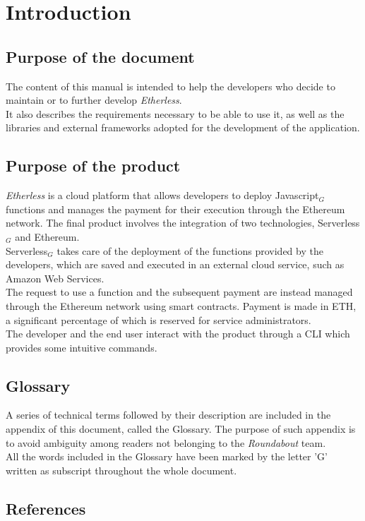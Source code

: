 \section{Introduction}

	\subsection{Purpose of the document}
	The content of this manual is intended to help the developers who decide to maintain or to further develop \textit{Etherless}. \\
	It also describes the requirements necessary to be able to use it, as well as the libraries and external frameworks adopted for the development of the application.


	\subsection{Purpose of the product}
	\textit{Etherless} is a cloud platform that allows developers to deploy Javascript$_{G}$ functions and manages the payment for their execution through the Ethereum network.
	The final product involves the integration of two technologies, Serverless$_{G}$ and Ethereum.\\
	Serverless$_{G}$ takes care of the deployment of the functions provided by the developers, which are saved and executed in an external cloud service, such as Amazon Web Services.\\
	The request to use a function and the subsequent payment are instead managed through the Ethereum network using smart contracts. Payment is made in ETH, a significant percentage of which is reserved for service administrators.\\
	The developer and the end user interact with the product through a CLI which provides some intuitive commands.


	\subsection{Glossary}
	A series of technical terms followed by their description are included in the appendix of this document, called the Glossary. The purpose of such appendix is to avoid ambiguity among readers not belonging to the \textit{Roundabout} team.\\
	All the words included in the Glossary have been marked by the letter 'G' written as subscript throughout the whole document.


	\subsection{References}

